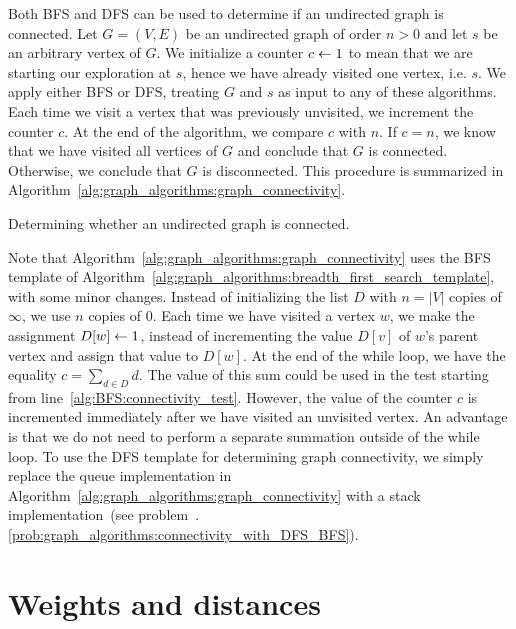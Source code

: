 Both BFS and DFS can be used to determine if an
undirected graph is connected. Let $G = (V, E)$ be an undirected graph
of order $n > 0$ and let $s$ be an arbitrary vertex of $G$. We
initialize a counter $c \leftarrow 1$ to mean that we are starting our
exploration at $s$, hence we have already visited one vertex,
i.e. $s$. We apply either BFS or DFS, treating
$G$ and $s$ as input to any of these algorithms. Each time we visit a
vertex that was previously unvisited, we increment the counter $c$. At
the end of the algorithm, we compare $c$ with $n$. If $c = n$, we know
that we have visited all vertices of $G$ and conclude that $G$ is
connected. Otherwise, we conclude that $G$ is disconnected. This
procedure is summarized in
Algorithm~\ref{alg:graph_algorithms:graph_connectivity}.

\begin{algorithm}[!htbp]

\caption{Determining whether an undirected graph is connected.}
\label{alg:graph_algorithms:graph_connectivity}
\end{algorithm}

Note that Algorithm~\ref{alg:graph_algorithms:graph_connectivity} uses
the BFS template of
Algorithm~\ref{alg:graph_algorithms:breadth_first_search_template},
with some minor changes. Instead of initializing the list $D$ with
$n = |V|$ copies of $\infty$, we use $n$ copies of $0$. Each time we
have visited a vertex $w$, we make the assignment $D[w] \leftarrow 1$,
instead of incrementing the value $D[v]$ of $w$'s parent vertex and
assign that value to $D[w]$. At the end of the while loop, we have the
equality $c = \sum_{d \in D} d$. The value of this sum could be used
in the test starting from line~\ref{alg:BFS:connectivity_test}.
However, the value of the counter $c$ is incremented immediately after
we have visited an unvisited vertex. An advantage is that we do not
need to perform a separate summation outside of the while loop. To use
the DFS template for determining graph
connectivity, we simply replace the
queue implementation in
Algorithm~\ref{alg:graph_algorithms:graph_connectivity} with a
stack implementation~(see
problem~\thechapter.\ref{prob:graph_algorithms:connectivity_with_DFS_BFS}).



\section{Weights and distances}
\label{sec:graph_algorithms:weights_distances}

